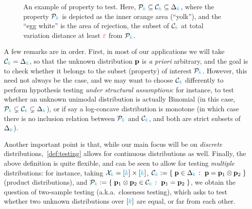 \begin{figure}[htbp]
\caption[An example of property to test. Here, $\property_\ab\subseteq \class_\ab\subseteq \distribs{\ab}$, where the property $\property_\ab$ is depicted as the inner orange area (``yolk''), and the ``egg white'' is the  area of rejection, \ie the subset of $\class_\ab$ at total variation distance at least $\dst$ from $\property_\ab$.]{An example of property to test. Here, $\property_\ab\subseteq \class_\ab\subseteq \distribs{\ab}$, where the property $\property_\ab$ is depicted as the inner orange area (``yolk''), and the ``egg white'' is the  area of rejection, \ie the subset of $\class_\ab$ at total variation distance at least $\dst$ from $\property_\ab$.\label{fig:propertytesting}\footnotemark}
\end{figure}


A few remarks are in order. First, in most of our applications we will take $\mathcal{C}_{\textcolor{cyan}{k}}=\Delta_{{\textcolor{cyan}{k}}}$, so that the unknown distribution $\mathbf{p}$ is \emph{a priori} arbitrary, and the goal is to check whether it belongs to the subset (property) of interest $\property_\ab$. However, this need not always be the case, and we may want to choose $\class_\ab$ differently to perform hypothesis testing \emph{under structural assumptions}: for instance, to test whether an unknown unimodal distribution is actually Binomial (in this case, $\mathcal{P}_{\textcolor{cyan}{k}} \subsetneq \mathcal{C}_{\textcolor{cyan}{k}}\subsetneq \Delta_{{\textcolor{cyan}{k}}}$), or if say a log-concave distribution is monotone (in which case there is no inclusion relation between $\property_\ab$ and $\class_\ab$, and both are strict subsets of $\Delta_{{\textcolor{cyan}{k}}}$).

Another important point is that, while our main focus will be on \emph{discrete} distributions,~\cref{def:testing} allows for continuous distributions as well. Finally, the above definition is quite flexible, and can be seen to allow for testing \emph{multiple} distributions: for instance, taking $\mathcal{X}_{\textcolor{cyan}{k}}=[{\textcolor{cyan}{k}}]\times[{\textcolor{cyan}{k}}]$, $\class_\ab \eqdef \setOfSuchThat{ \p\in\distribs{\ab} }{ \p=\p_1\otimes\p_2 }$ (product distributions), and $\property_\ab \eqdef \setOfSuchThat{\p_1\otimes\p_2 \in \class_\ab}{\p_1=\p_2}$, we obtain the question of two-sample testing (a.k.a.\ closeness testing), which asks to test whether two unknown distributions over $[{\textcolor{cyan}{k}}]$ are equal, or far from each other.
